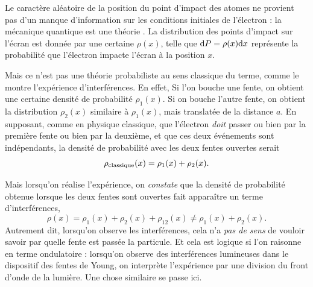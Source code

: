 \documentclass[12pt,fancy]{cours}
\begin{document}

Le caractère aléatoire de la position du point d’impact des atomes ne provient pas d’un manque d’information sur les conditions initiales de l’électron : la mécanique quantique est une théorie . La distribution des points d’impact sur l’écran est donnée par une certaine  $\rho(x)$, telle que $\mathrm{d} P = \rho(x) \mathrm{d} x$ représente la probabilité que l’électron impacte l’écran à la position $x$.


Mais ce n’est pas une théorie probabiliste au sens classique du terme, comme le montre l’expérience d’interférences. En effet, Si l'on bouche une fente, on obtient une certaine densité de probabilité $\rho_1(x)$. Si on bouche l’autre fente, on obtient la distribution $\rho_2(x)$ similaire à $\rho_1(x)$, mais translatée de la distance $a$. En supposant, comme en physique classique, que l’électron \textit{doit} passer ou bien par la première fente ou bien par la deuxième, et que ces deux événements sont indépendants, la densité de probabilité avec les deux fentes ouvertes serait
\begin{equation}
  \rho_{\rm classique}(x) = \rho_1(x) + \rho_2(x).
\end{equation}

Mais lorsqu'on réalise l'expérience, on \textit{constate} que la densité de probabilité obtenue lorsque les deux fentes sont ouvertes fait apparaître un terme d’interférences,
\begin{equation}
  \rho(x) = \rho_1(x) + \rho_2(x) + \rho_{12}(x) \neq \rho_1(x) + \rho_2(x).
\end{equation}
 Autrement dit, lorsqu'on observe les interférences, cela n'a \textit{pas de sens} de vouloir savoir par quelle fente est passée la particule. Et cela est logique si l’on raisonne en terme ondulatoire : lorsqu’on observe des interférences lumineuses dans le dispositif des fentes de Young, on interprète l’expérience par une division du front d’onde de la lumière. Une chose similaire se passe ici.
\end{document}

